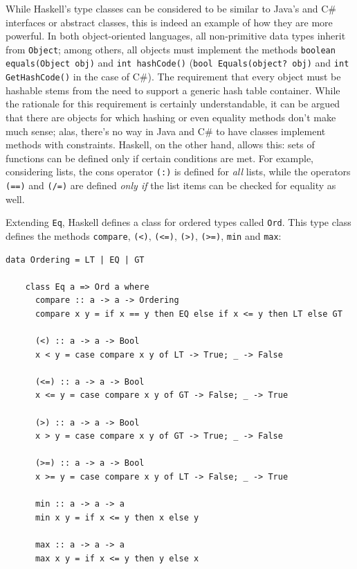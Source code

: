 \documentclass[UdineBachThesis,american,11pt]{PhdThesis}
\begin{document}
  While Haskell's type classes can be considered to be similar to Java's and C\#
  interfaces or abstract classes, this is indeed an example of how they are more
  powerful. In both object-oriented languages, all non-primitive data types
  inherit from \mbox{\texttt{Object}}; among others, all objects must implement
  the methods \mbox{\texttt{boolean equals(Object obj)}} and
  \mbox{\texttt{int hashCode()}} (\mbox{\texttt{bool Equals(object? obj)}} and
  \mbox{\texttt{int GetHashCode()}} in the case of C\#). The requirement that
  every object must be hashable stems from the need to support a generic hash
  table container. While the rationale for this requirement is certainly
  understandable, it can be argued that there are objects for which hashing or
  even equality methods don't make much sense; alas, there's no way in Java and
  C\# to have classes implement methods with constraints. Haskell, on the other
  hand, allows this: sets of functions can be defined only if certain conditions
  are met. For example, considering lists, the cons operator \mbox{\texttt{(:)}}
  is defined for \emph{all} lists, while the operators \mbox{\texttt{(==)}} and
  \mbox{\texttt{(/=)}} are defined \emph{only if} the list items can be checked
  for equality as well.

  Extending \mbox{\texttt{Eq}}, Haskell defines a class for ordered types called
  \mbox{\texttt{Ord}}. This type class defines the methods
  \mbox{\texttt{compare}}, \mbox{\texttt{(<)}}, \mbox{\texttt{(<=)}},
  \mbox{\texttt{(>)}}, \mbox{\texttt{(>=)}}, \mbox{\texttt{min}} and
  \mbox{\texttt{max}}:

  \begin{Verbatim}[gobble=4,fontsize=\small]
    data Ordering = LT | EQ | GT

    class Eq a => Ord a where
      compare :: a -> a -> Ordering
      compare x y = if x == y then EQ else if x <= y then LT else GT

      (<) :: a -> a -> Bool
      x < y = case compare x y of LT -> True; _ -> False

      (<=) :: a -> a -> Bool
      x <= y = case compare x y of GT -> False; _ -> True

      (>) :: a -> a -> Bool
      x > y = case compare x y of GT -> True; _ -> False

      (>=) :: a -> a -> Bool
      x >= y = case compare x y of LT -> False; _ -> True

      min :: a -> a -> a
      min x y = if x <= y then x else y

      max :: a -> a -> a
      max x y = if x <= y then y else x
  \end{Verbatim}
\end{document}
